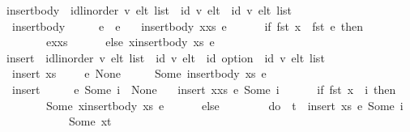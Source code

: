 \documentclass[acmlarge,review,anonymous]{acmart}\settopmatter{printfolios=true}
\begin{document}
\begin{isabellebody}
\isanewline
{}\isamarkupfalse%
\ insert{\isacharunderscore}body\ {\isacharcolon}{\isacharcolon}\ {\isachardoublequoteopen}{\isacharparenleft}{\isacharprime}id{\isacharcolon}{\isacharcolon}{\isacharbraceleft}linorder{\isacharbraceright}{\isacharcomma}\ {\isacharprime}v{\isacharparenright}\ elt\ list\ {\isasymRightarrow}\ {\isacharparenleft}{\isacharprime}id{\isacharcomma}\ {\isacharprime}v{\isacharparenright}\ elt\ {\isasymRightarrow}\ {\isacharparenleft}{\isacharprime}id{\isacharcomma}\ {\isacharprime}v{\isacharparenright}\ elt\ list{\isachardoublequoteclose}\ \isanewline
\ \ {\isachardoublequoteopen}insert{\isacharunderscore}body\ {\isacharbrackleft}{\isacharbrackright}\ \ \ \ \ e\ {\isacharequal}\ {\isacharbrackleft}e{\isacharbrackright}{\isachardoublequoteclose}\ {\isacharbar}\isanewline
\ \ {\isachardoublequoteopen}insert{\isacharunderscore}body\ {\isacharparenleft}x{\isacharhash}xs{\isacharparenright}\ e\ {\isacharequal}\isanewline
\ \ \ \ \ {\isacharparenleft}if\ fst\ x\ {\isacharless}\ fst\ e\ then\isanewline
\ \ \ \ \ \ \ \ e{\isacharhash}x{\isacharhash}xs\isanewline
\ \ \ \ \ \ else\ x{\isacharhash}insert{\isacharunderscore}body\ xs\ e{\isacharparenright}{\isachardoublequoteclose}\isanewline
\isanewline
{}\isamarkupfalse%
\ insert\ {\isacharcolon}{\isacharcolon}\ {\isachardoublequoteopen}{\isacharparenleft}{\isacharprime}id{\isacharcolon}{\isacharcolon}{\isacharbraceleft}linorder{\isacharbraceright}{\isacharcomma}\ {\isacharprime}v{\isacharparenright}\ elt\ list\ {\isasymRightarrow}\ {\isacharparenleft}{\isacharprime}id{\isacharcomma}\ {\isacharprime}v{\isacharparenright}\ elt\ {\isasymRightarrow}\ {\isacharprime}id\ option\ {\isasymrightharpoonup}\ {\isacharparenleft}{\isacharprime}id{\isacharcomma}\ {\isacharprime}v{\isacharparenright}\ elt\ list{\isachardoublequoteclose}\ \isanewline
\ \ {\isachardoublequoteopen}insert\ xs\ \ \ \ \ e\ None\ \ \ \ \ {\isacharequal}\ Some\ {\isacharparenleft}insert{\isacharunderscore}body\ xs\ e{\isacharparenright}{\isachardoublequoteclose}\ {\isacharbar}\isanewline
\ \ {\isachardoublequoteopen}insert\ {\isacharbrackleft}{\isacharbrackright}\ \ \ \ \ e\ {\isacharparenleft}Some\ i{\isacharparenright}\ {\isacharequal}\ None{\isachardoublequoteclose}\ {\isacharbar}\isanewline
\ \ {\isachardoublequoteopen}insert\ {\isacharparenleft}x{\isacharhash}xs{\isacharparenright}\ e\ {\isacharparenleft}Some\ i{\isacharparenright}\ {\isacharequal}\isanewline
\ \ \ \ \ {\isacharparenleft}if\ fst\ x\ {\isacharequal}\ i\ then\isanewline
\ \ \ \ \ \ \ \ Some\ {\isacharparenleft}x{\isacharhash}insert{\isacharunderscore}body\ xs\ e{\isacharparenright}\isanewline
\ \ \ \ \ \ else\isanewline
\ \ \ \ \ \ \ \ do\ {\isacharbraceleft}\ t\ {\isasymleftarrow}\ insert\ xs\ e\ {\isacharparenleft}Some\ i{\isacharparenright}\isanewline
\ \ \ \ \ \ \ \ \ \ \ {\isacharsemicolon}\ Some\ {\isacharparenleft}x{\isacharhash}t{\isacharparenright}\isanewline
\ \ \ \ \ \ \ \ \ \ \ {\isacharbraceright}{\isacharparenright}{\isachardoublequoteclose}\isanewline
\end{isabellebody}
\end{document}
